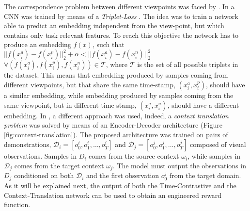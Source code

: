 
\newline The correspondence problem between different viewpoints was faced by \cite{sermanet2018time_contrastive,liu2018imitation_from_observation}. In \cite{sermanet2018time_contrastive} a CNN was trained by means of a \textit{Triplet-Loss} \cite{schroff2015triplet_loss}. The idea was to train a network able to predict an embedding independent from the view-point, but which contains only task relevant features. To reach this objective the network has to produce an embedding $f(x)$, such that $|| f(x^{a}_{i}) - f(x^{p}_{i})||^{2}_{2} + \alpha < || f(x^{a}_{i}) - f(x^{n}_{i})||^{2}_{2}$ $\forall (f(x^{a}_{i}), f(x^{p}_{i}), f(x^{n}_{i})) \in \mathcal{T}$, where $\mathcal{T}$ is the set of all possible triplets in the dataset. This means that embedding produced by samples coming from different viewpoints, but that share the same time-stamp, $(x^{a}_{i},x^{p}_{i})$, should have a similar embedding, while embedding produced by samples coming from the same viewpoint, but in different time-stamp, $(x^{a}_{i},x^{n}_{i})$, should have a different embedding. In \cite{liu2018imitation_from_observation}, a different approach was used, indeed, a \textit{context translation problem} was solved by means of an Encoder-Decoder architecture (Figure \ref{fig:context-translation}). The proposed architecture was trained on pairs of demonstrations, $\mathcal{D}_{i}=[o^{i}_{0},o^{i}_{1},\dots,o^{i}_{T}]$ and $\mathcal{D}_{j}=[o^{j}_{0},o^{j}_{1},\dots,o^{j}_{T}]$ composed of visual observations. Samples in $D_{i}$ comes from the source context $\omega_{i}$, while samples in $\mathcal{D}_{j}$ comes from the target context $\omega_{j}$. The model must output the observations in $D_{j}$ conditioned on both $\mathcal{D}_{i}$ and the first observation $o^{j}_{0}$ from the target domain. As it will be explained next, the output of both the Time-Contrastive and the Context-Translation network can be used to obtain an engineered reward function.


